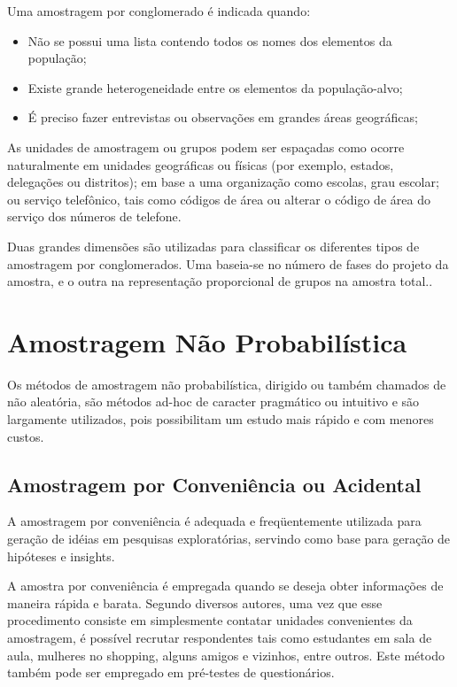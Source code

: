 Uma amostragem por conglomerado é indicada quando:


\begin{itemize}
  \item Não se possui uma lista contendo todos os nomes dos elementos da população;
  \item Existe grande heterogeneidade entre os elementos da população-alvo;
  \item É preciso fazer entrevistas ou observações em grandes áreas geográficas;
\end{itemize}


As unidades de amostragem ou grupos podem ser espaçadas como ocorre naturalmente em unidades geográficas ou físicas (por exemplo, estados, delegações ou distritos); em base  a uma organização como escolas, grau escolar; ou serviço telefônico, tais como códigos de área ou alterar o código de área do serviço dos números de telefone.\vskip0.3cm

Duas grandes dimensões são utilizadas para classificar os diferentes tipos de amostragem por conglomerados. Uma baseia-se no número de fases do projeto da amostra, e o outra na representação proporcional de grupos na amostra total..\vskip0.3cm


\section{Amostragem Não Probabilística}


Os métodos de amostragem não probabilística, dirigido ou também chamados de não aleatória, são métodos ad-hoc de caracter pragmático ou intuitivo e são largamente utilizados, pois possibilitam um
estudo mais rápido e com menores custos.




\subsection{Amostragem por Conveniência ou Acidental}


\inic A amostragem por conveniência é adequada e freqüentemente utilizada para geração de idéias em pesquisas exploratórias, servindo como base para geração de hipóteses e insights.\vskip0.3cm



A amostra por conveniência é empregada quando se deseja obter informações de maneira rápida e barata. Segundo diversos autores, uma vez que esse procedimento consiste em simplesmente contatar unidades convenientes da amostragem, é possível recrutar respondentes tais como estudantes em sala de aula, mulheres no shopping, alguns amigos e vizinhos, entre outros. Este método também pode ser empregado em pré-testes de questionários.\vskip0.3cm


